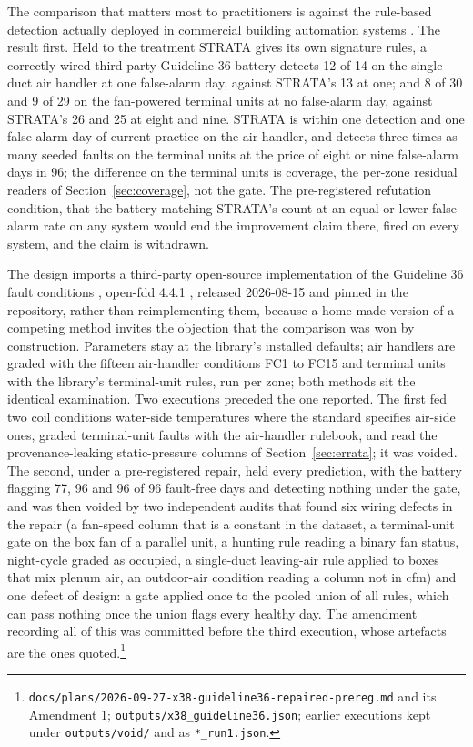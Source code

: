 \documentclass[11pt,letterpaper]{article}
\begin{document}
The comparison that matters most to practitioners is against the rule-based detection actually deployed in commercial building automation systems \cite{granderson2017fddtoolsurvey}. The result first. Held to the treatment STRATA gives its own signature rules, a correctly wired third-party Guideline 36 battery detects 12 of 14 on the single-duct air handler at one false-alarm day, against STRATA's 13 at one; and 8 of 30 and 9 of 29 on the fan-powered terminal units at no false-alarm day, against STRATA's 26 and 25 at eight and nine. STRATA is within one detection and one false-alarm day of current practice on the air handler, and detects three times as many seeded faults on the terminal units at the price of eight or nine false-alarm days in 96; the difference on the terminal units is coverage, the per-zone residual readers of Section~\ref{sec:coverage}, not the gate. The pre-registered refutation condition, that the battery matching STRATA's count at an equal or lower false-alarm rate on any system would end the improvement claim there, fired on every system, and the claim is withdrawn.

The design imports a third-party open-source implementation of the Guideline 36 fault conditions \cite{ashrae2021guideline36}, open-fdd 4.4.1 \cite{openfdd2025}, released 2026-08-15 and pinned in the repository, rather than reimplementing them, because a home-made version of a competing method invites the objection that the comparison was won by construction. Parameters stay at the library's installed defaults; air handlers are graded with the fifteen air-handler conditions FC1 to FC15 and terminal units with the library's terminal-unit rules, run per zone; both methods sit the identical examination. Two executions preceded the one reported. The first fed two coil conditions water-side temperatures where the standard specifies air-side ones, graded terminal-unit faults with the air-handler rulebook, and read the provenance-leaking static-pressure columns of Section~\ref{sec:errata}; it was voided. The second, under a pre-registered repair, held every prediction, with the battery flagging 77, 96 and 96 of 96 fault-free days and detecting nothing under the gate, and was then voided by two independent audits that found six wiring defects in the repair (a fan-speed column that is a constant in the dataset, a terminal-unit gate on the box fan of a parallel unit, a hunting rule reading a binary fan status, night-cycle graded as occupied, a single-duct leaving-air rule applied to boxes that mix plenum air, an outdoor-air condition reading a column not in cfm) and one defect of design: a gate applied once to the pooled union of all rules, which can pass nothing once the union flags every healthy day. The amendment recording all of this was committed before the third execution, whose artefacts are the ones quoted.\footnote{\texttt{docs/plans/2026-09-27-x38-guideline36-repaired-prereg.md} and its Amendment 1; \texttt{outputs/x38\_guideline36.json}; earlier executions kept under \texttt{outputs/void/} and as \texttt{*\_run1.json}.}
\end{document}
